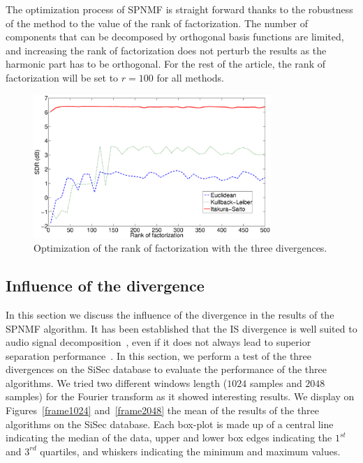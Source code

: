 The optimization process of SPNMF is straight forward thanks to the robustness of the method to the value of the rank of factorization. The number of components that can be decomposed by orthogonal basis functions are limited, and increasing the rank of factorization does not perturb the results as the harmonic part has to be orthogonal. For the rest of the article, the rank of factorization will be set to $r=100$ for all methods.



\begin{figure}[htb]

  \centering 
  \includegraphics[width=9cm]{fig/RankOfFact.eps}
  \caption{\label{RankOfFact} Optimization of the rank of factorization with the three divergences.}
  
\end{figure}




\subsection{Influence of the divergence}
\label{setup:divergence}

In this section we discuss the influence of the divergence in the results of the SPNMF algorithm. It has been established that the IS divergence is well suited to audio signal decomposition~\cite{gray1980distortion}, even if it does not always lead to superior separation performance~\cite{canadas2014percussive}. In this section, we perform a test of the three divergences on the SiSec database to evaluate the performance of the three algorithms. We tried two different windows length ($1024$ samples and $2048$ samples) for the Fourier transform as it showed interesting results. We display on Figures~\ref{frame1024} and~\ref{frame2048} the mean of the results of the three algorithms on the SiSec database. Each box-plot is made up of a central line indicating the median of the data, upper and lower box edges indicating the $1^{st}$ and $3^{rd}$ quartiles, and whiskers indicating the minimum and maximum values. 

